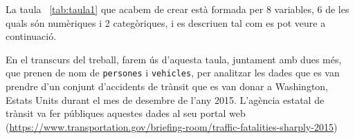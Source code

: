 \documentclass[12pt,longbibliography]{article}
\theoremstyle{definition}
\theoremstyle{remark}
\begin{document}
La taula ~\ref{tab:taula1} que acabem de crear està formada per 8 variables, 6 de les quals són numèriques i 2 categòriques, i es descriuen tal com es pot veure a continuació.

\begin{table}[h]
\caption{Especificacions de la taula Accidents}
\label{tab:taula1}
\end{table}



En el transcurs del treball, farem ús d'aquesta taula, juntament amb dues més, que prenen de nom de \verb|persones| i \verb|vehicles|, per analitzar les dades que es van prendre d'un conjunt d'accidents de trànsit que es van donar a Washington, Estats Units durant el mes de desembre de l'any 2015. L'agència estatal de trànsit va fer públiques aquestes dades al seu portal web (\url{https://www.transportation.gov/briefing-room/traffic-fatalities-sharply-2015})
\end{document}
